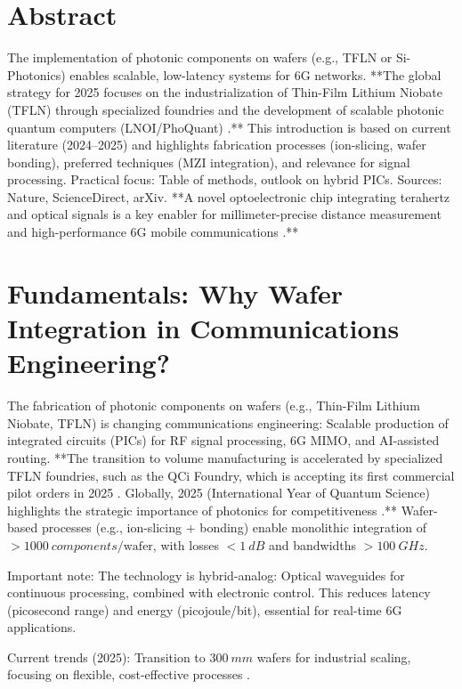 \section*{Abstract}
		The implementation of photonic components on wafers (e.g., TFLN or Si-Photonics) enables scalable, low-latency systems for 6G networks. **The global strategy for 2025 focuses on the industrialization of Thin-Film Lithium Niobate (TFLN) through specialized foundries \cite{tfln_foundry} and the development of scalable photonic quantum computers (LNOI/PhoQuant) \cite{phoquant}.** This introduction is based on current literature (2024–2025) and highlights fabrication processes (ion-slicing, wafer bonding), preferred techniques (MZI integration), and relevance for signal processing. Practical focus: Table of methods, outlook on hybrid PICs. Sources: Nature, ScienceDirect, arXiv. **A novel optoelectronic chip integrating terahertz and optical signals is a key enabler for millimeter-precise distance measurement and high-performance 6G mobile communications \cite{thz_epfl}.**

	
	
	\section{Fundamentals: Why Wafer Integration in Communications Engineering?}
	
	The fabrication of photonic components on wafers (e.g., Thin-Film Lithium Niobate, TFLN) is changing communications engineering: Scalable production of integrated circuits (PICs) for RF signal processing, 6G MIMO, and AI-assisted routing. **The transition to volume manufacturing is accelerated by specialized TFLN foundries, such as the QCi Foundry, which is accepting its first commercial pilot orders in 2025 \cite{tfln_foundry}. Globally, 2025 (International Year of Quantum Science) highlights the strategic importance of photonics for competitiveness \cite{quantenjahr25}.** Wafer-based processes (e.g., ion-slicing + bonding) enable monolithic integration of $>\SI{1000}{components}/\text{wafer}$, with losses $<\SI{1}{dB}$ and bandwidths $>\SI{100}{GHz}$.
	\begin{important}
		Important note: The technology is hybrid-analog: Optical waveguides for continuous processing, combined with electronic control. This reduces latency (picosecond range) and energy (picojoule/bit), essential for real-time 6G applications.
	\end{important}
	
	Current trends (2025): Transition to $\SI{300}{mm}$ wafers for industrial scaling, focusing on flexible, cost-effective processes \cite{flexible_wafer}.

